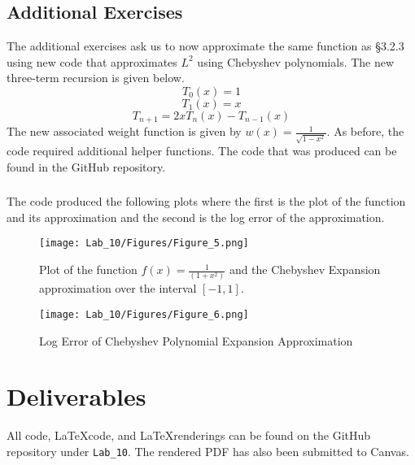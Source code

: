 \documentclass{article}
\begin{document}
\subsection{Additional Exercises}
The additional exercises ask us to now approximate the same function as \S3.2.3 using new code that approximates \(L^2\) using Chebyshev polynomials. The new three-term recursion is given below.
\[
T_0(x) = 1
\]
\[
T_1(x) = x
\]
\[
T_{n+1}=2xT_n(x)-T_{n-1}(x)
\]
The new associated weight function is given by \(w(x) = \frac{1}{\sqrt{1-x^2}}\). As before, the code required additional helper functions. The code that was produced can be found in the GitHub repository.

\subsubsection{}
The code produced the following plots where the first is the plot of the function and its approximation and the second is the log error of the approximation.
\newpage
\begin{figure}[h!]
    \centering
    \texttt{[image: Lab\_10/Figures/Figure\_5.png]}
    \caption{Plot of the function \(f(x)=\frac{1}{(1+x^2)}\) and the Chebyshev Expansion approximation over the interval \([-1,1]\).}
    \label{fig:cheb}
\end{figure}
\begin{figure}[h!]
    \centering
    \texttt{[image: Lab\_10/Figures/Figure\_6.png]}
    \caption{Log Error of Chebyshev Polynomial Expansion Approximation}
    \label{fig:cheb_err}
\end{figure}

\section{Deliverables}
All code, \LaTeX code, and \LaTeX renderings can be found on the GitHub repository under \texttt{Lab\_10}. The rendered PDF has also been submitted to Canvas.
\end{document}
